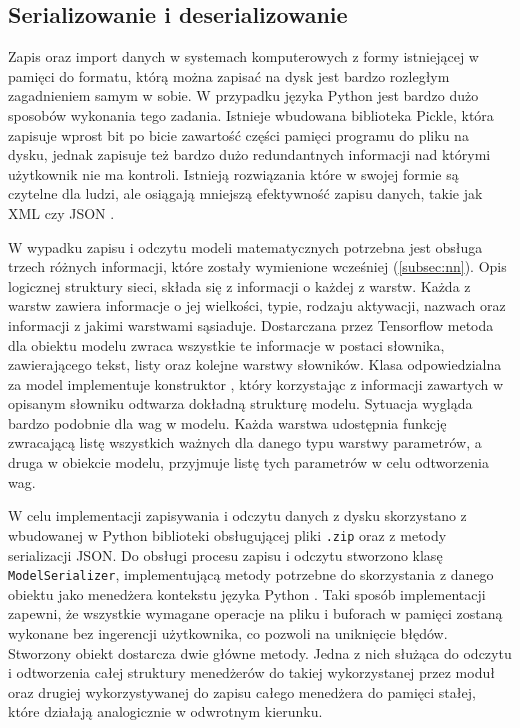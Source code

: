 \subsection{Serializowanie i deserializowanie}
Zapis oraz import danych w systemach komputerowych z formy istniejącej w pamięci do formatu, którą można zapisać na dysk jest bardzo rozległym zagadnieniem samym w sobie. W przypadku języka Python jest bardzo dużo sposobów wykonania tego zadania. Istnieje wbudowana biblioteka Pickle, która zapisuje wprost bit po bicie zawartość części pamięci programu do pliku na dysku, jednak zapisuje też bardzo dużo redundantnych informacji nad którymi użytkownik nie ma kontroli. Istnieją rozwiązania które w swojej formie są czytelne dla ludzi, ale osiągają mniejszą efektywność zapisu danych, takie jak XML \cite{book:xml_handbook} czy JSON \cite{book:json_for_begginers}. 

W wypadku zapisu i odczytu modeli matematycznych potrzebna jest obsługa trzech różnych informacji, które zostały wymienione wcześniej (\ref{subsec:nn}). Opis logicznej struktury sieci, składa się z informacji o każdej z warstw. Każda z warstw zawiera informacje o jej wielkości, typie, rodzaju aktywacji, nazwach oraz informacji z jakimi warstwami sąsiaduje. Dostarczana przez Tensorflow metoda dla obiektu modelu zwraca wszystkie te informacje w postaci słownika, zawierającego tekst, listy oraz kolejne warstwy słowników. Klasa odpowiedzialna za model implementuje konstruktor \cite{book:czysty_kod}, który korzystając z informacji zawartych w opisanym słowniku odtwarza dokładną strukturę modelu. Sytuacja wygląda bardzo podobnie dla wag w modelu. Każda warstwa udostępnia funkcję zwracającą listę wszystkich ważnych dla danego typu warstwy parametrów, a druga w obiekcie modelu, przyjmuje listę tych parametrów w celu odtworzenia wag.

W celu implementacji zapisywania i odczytu danych z dysku skorzystano z wbudowanej w Python biblioteki obsługującej pliki \verb+.zip+ oraz z metody serializacji JSON. Do obsługi procesu zapisu i odczytu stworzono klasę \verb+ModelSerializer+, implementującą metody potrzebne do skorzystania z danego obiektu jako menedżera kontekstu języka Python \cite{book:learning_python}. Taki sposób implementacji zapewni, że wszystkie wymagane operacje na pliku i buforach w pamięci zostaną wykonane bez ingerencji użytkownika, co pozwoli na uniknięcie błędów. Stworzony obiekt dostarcza dwie główne metody. Jedna z nich służąca do odczytu i odtworzenia całej struktury menedżerów do takiej wykorzystanej przez moduł oraz drugiej wykorzystywanej do zapisu całego menedżera do pamięci stałej, które działają analogicznie w odwrotnym kierunku.

